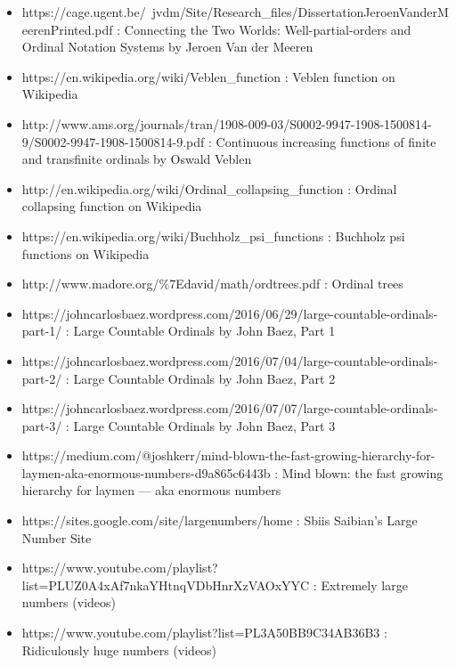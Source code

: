 \documentclass[10pt]{article}
\begin{document}
\begin{itemize}
\item https://cage.ugent.be/~jvdm/Site/Research\_files/DissertationJeroenVanderMeerenPrinted.pdf : 
Connecting the Two Worlds: Well-partial-orders and Ordinal Notation Systems by Jeroen Van der Meeren

\item https://en.wikipedia.org/wiki/Veblen\_function : 
Veblen function on Wikipedia

\item http://www.ams.org/journals/tran/1908-009-03/S0002-9947-1908-1500814-9/S0002-9947-1908-1500814-9.pdf : 
Continuous increasing functions of finite and transfinite ordinals by
Oswald Veblen

\item http://en.wikipedia.org/wiki/Ordinal\_collapsing\_function : 
Ordinal collapsing function on Wikipedia

\item https://en.wikipedia.org/wiki/Buchholz\_psi\_functions : 
Buchholz psi functions on Wikipedia

\item http://www.madore.org/\%7Edavid/math/ordtrees.pdf : 
Ordinal trees

\item https://johncarlosbaez.wordpress.com/2016/06/29/large-countable-ordinals-part-1/ : Large Countable Ordinals by John Baez, Part 1
\item https://johncarlosbaez.wordpress.com/2016/07/04/large-countable-ordinals-part-2/ : Large Countable Ordinals by John Baez, Part 2
\item https://johncarlosbaez.wordpress.com/2016/07/07/large-countable-ordinals-part-3/ : Large Countable Ordinals by John Baez, Part 3

\item https://medium.com/@joshkerr/mind-blown-the-fast-growing-hierarchy-for-laymen-aka-enormous-numbers-d9a865c6443b : Mind blown: the fast growing hierarchy for laymen — aka enormous numbers

\item https://sites.google.com/site/largenumbers/home : 
Sbiis Saibian's Large Number Site

\item https://www.youtube.com/playlist?list=PLUZ0A4xAf7nkaYHtnqVDbHnrXzVAOxYYC :
Extremely large numbers (videos) 

\item https://www.youtube.com/playlist?list=PL3A50BB9C34AB36B3 :
Ridiculously huge numbers (videos)


\end{itemize}
\end{document}
